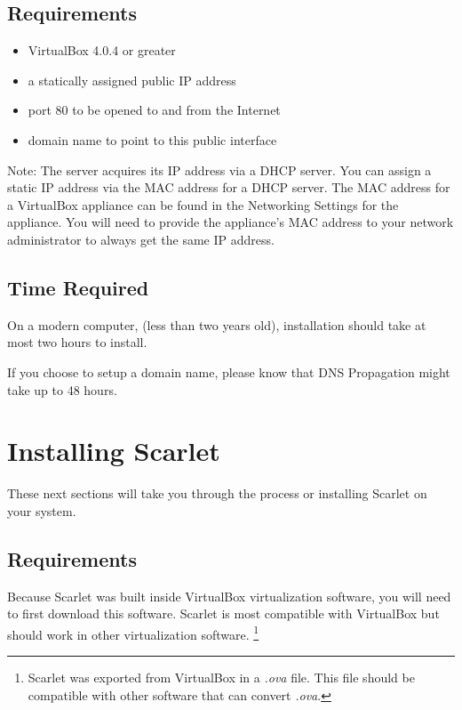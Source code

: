 \documentclass[pdftex,11pt,letterpaper]{article}
\begin{document}
\subsection{Requirements}

\begin{itemize}
\item VirtualBox 4.0.4 or greater
\item a statically assigned public IP address 
\item port 80 to be opened to and from the Internet
\item domain name to point to this public interface
\end{itemize}

Note:
The server acquires its IP address via a DHCP server.  You can assign a static IP address via the MAC address for a DHCP server.  The MAC address for a VirtualBox appliance can be found in the Networking Settings for the appliance. You will need to provide the appliance's MAC address to your network administrator to always get the same IP address.

\subsection{Time Required}

On a modern computer, (less than two years old), installation should take at most two hours to install.

If you choose to setup a domain name, please know that DNS Propagation might take up to 48 hours.

\section{Installing Scarlet}

These next sections will take you through the process or installing Scarlet on your system.

\subsection{Requirements}

Because Scarlet was built inside VirtualBox virtualization software, you will need to first download this software.  Scarlet is most compatible with VirtualBox but should work in other virtualization software.
\footnote{Scarlet was exported from VirtualBox in a \textit{.ova} file.  This file should be compatible with other software that can convert \textit{.ova}.}
\end{document}
